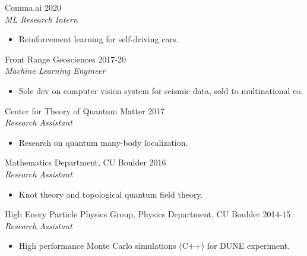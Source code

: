 \documentclass[margin]{res}
\begin{document}
\begin{resume}
                 Comma.ai \hfill            2020 \\
		{\sl ML Research Intern}
                 \begin{itemize}  \itemsep -2pt %
                 \item Reinforcement learning for self-driving cars.
                 \end{itemize}

               Front Range Geosciences \hfill            2017-20 \\
                 {\sl Machine Learning Engineer}
                 \begin{itemize}  \itemsep -2pt %
                 \item Sole dev on computer vision system for seismic data, sold to multinational co.
                 \end{itemize}
                 Center for Theory of Quantum Matter \hfill            2017 \\
		{\sl Research Assistant}
                 \begin{itemize}  \itemsep -2pt %
                 \item Research on quantum many-body localization.
                 \end{itemize}

                Mathematics Department, CU Boulder \hfill            2016 \\
		 {\sl Research Assistant}
                 \begin{itemize}  \itemsep -2pt %
                 \item Knot theory and topological quantum field theory.
                 \end{itemize}

                High Enery Particle Physics Group, Physics Department, CU Boulder  \hfill            2014-15 \\
		{\sl Research Assistant}
                 \begin{itemize}  \itemsep -2pt %
                 \item High performance Monte Carlo simulations (C++) for DUNE experiment.
                 \end{itemize}


\end{resume}
\end{document}
